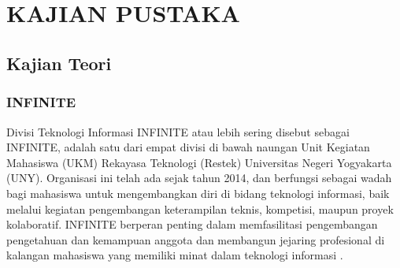 
\chapter[KAJIAN PUSTAKA]{\\ KAJIAN PUSTAKA}

\section{Kajian Teori}

\subsection{INFINITE}

Divisi Teknologi Informasi INFINITE atau lebih sering disebut sebagai INFINITE, adalah satu dari empat divisi di bawah naungan Unit Kegiatan Mahasiswa (UKM) Rekayasa Teknologi (Restek) Universitas Negeri Yogyakarta (UNY). Organisasi ini telah ada sejak tahun 2014, dan berfungsi sebagai wadah bagi mahasiswa untuk mengembangkan diri di bidang teknologi informasi, baik melalui kegiatan pengembangan keterampilan teknis, kompetisi, maupun proyek kolaboratif. INFINITE berperan penting dalam memfasilitasi pengembangan pengetahuan dan kemampuan anggota dan membangun jejaring profesional di kalangan mahasiswa yang memiliki minat dalam teknologi informasi \citep{INFINITE_2026_Website}.


